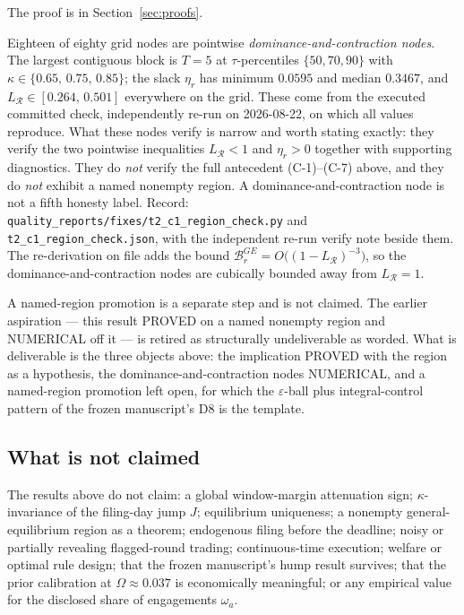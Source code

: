 The proof is in Section~\ref{sec:proofs}.

\begin{remark}
\label{rem:C1record}
Eighteen of eighty grid nodes are pointwise \emph{dominance-and-contraction nodes}. The largest
contiguous block is $T = 5$ at $\tau$-percentiles $\{50,70,90\}$ with
$\kappa \in \{0.65,\,0.75,\,0.85\}$; the slack $\eta_r$ has minimum $0.0595$ and median $0.3467$, and
$L_{\mathcal R} \in [0.264,\,0.501]$ everywhere on the grid. These come from the executed committed
check, independently re-run on 2026-08-22, on which all values reproduce. What these nodes verify is
narrow and worth stating exactly: they verify the two pointwise inequalities $L_{\mathcal R} < 1$ and
$\eta_r > 0$ together with supporting diagnostics. They do \emph{not} verify the full antecedent
(C-1)--(C-7) above, and they do \emph{not} exhibit a named nonempty region. A dominance-and-contraction
node is not a fifth honesty label. Record:
\texttt{quality\_reports/fixes/t2\_c1\_region\_check.py} and \texttt{t2\_c1\_region\_check.json},
with the independent re-run verify note beside them. The re-derivation on file adds the bound
$\mathcal B_r^{GE} = O\bigl((1-L_{\mathcal R})^{-3}\bigr)$, so the dominance-and-contraction nodes
are cubically bounded away from $L_{\mathcal R} = 1$.

A named-region promotion is a separate step and is not claimed. The earlier aspiration --- this
result PROVED on a named nonempty region and NUMERICAL off it --- is retired as
structurally undeliverable as worded. What is deliverable is the three objects above: the
implication PROVED with the region as a hypothesis, the dominance-and-contraction nodes
NUMERICAL, and a named-region promotion left open, for which the $\varepsilon$-ball plus
integral-control pattern of the frozen manuscript's D8 is the template.
\end{remark}

\subsection{What is not claimed}
\label{sec:not-claimed}

The results above do not claim: a global window-margin attenuation sign; $\kappa$-invariance of the
filing-day jump $J$; equilibrium uniqueness; a nonempty general-equilibrium region as a theorem;
endogenous filing before the deadline; noisy or partially revealing flagged-round trading;
continuous-time execution; welfare or optimal rule design; that the frozen manuscript's hump result
survives; that the prior calibration at $\Omega \approx 0.037$ is economically meaningful; or any
empirical value for the disclosed share of engagements $\omega_a$.

